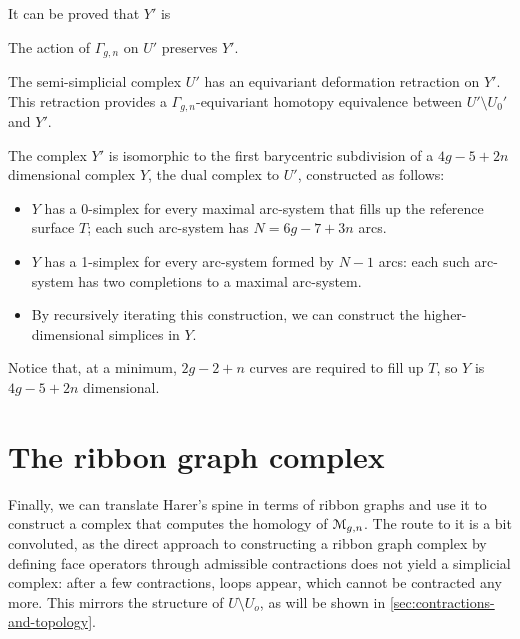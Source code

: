 It can be proved that $Y'$ is 

The action of $\Gamma_{g,n}$ on $U'$ preserves $Y'$.
\begin{theorem}
  \label{thm:spine}
  The semi-simplicial complex $U'$ has an equivariant deformation
  retraction on $Y'$.  This retraction provides a
  $\Gamma_{g,n}$-equivariant homotopy equivalence between $U' \setminus U_0'$ and
  $Y'$.
\end{theorem}

The complex $Y'$ is isomorphic to the first barycentric subdivision of
a $4g - 5 + 2n$ dimensional complex $Y$, the dual complex to $U'$,
constructed as follows:
\begin{itemize}
\item $Y$ has a 0-simplex for every maximal arc-system that fills up the
  reference surface $T$; each such arc-system has $N = 6g - 7 + 3n$ arcs.
\item $Y$ has a 1-simplex for every arc-system formed by $N-1$ arcs:
  each such arc-system has two completions to a maximal arc-system.
\item By recursively iterating this construction, we can construct the
  higher-dimensional simplices in $Y$.
\end{itemize}
Notice that, at a minimum, $2g - 2 +n$ curves are required to fill up
$T$, so $Y$ is $4g - 5 + 2n$ dimensional.



\section{The ribbon graph complex}
\label{sec:ribbon-graph-complex}

Finally, we can translate Harer's spine in terms of ribbon graphs and
use it to construct a complex that computes the homology of
$\mathcal{M}_{g,n}$.  The route to it is a bit convoluted, as the direct
approach to constructing a ribbon graph complex by defining face
operators through admissible contractions does not yield a simplicial
complex: after a few contractions, loops appear, which cannot be
contracted any more.  This mirrors the structure of $U \setminus U_o$, as will
be shown in \ref{sec:contractions-and-topology}.

